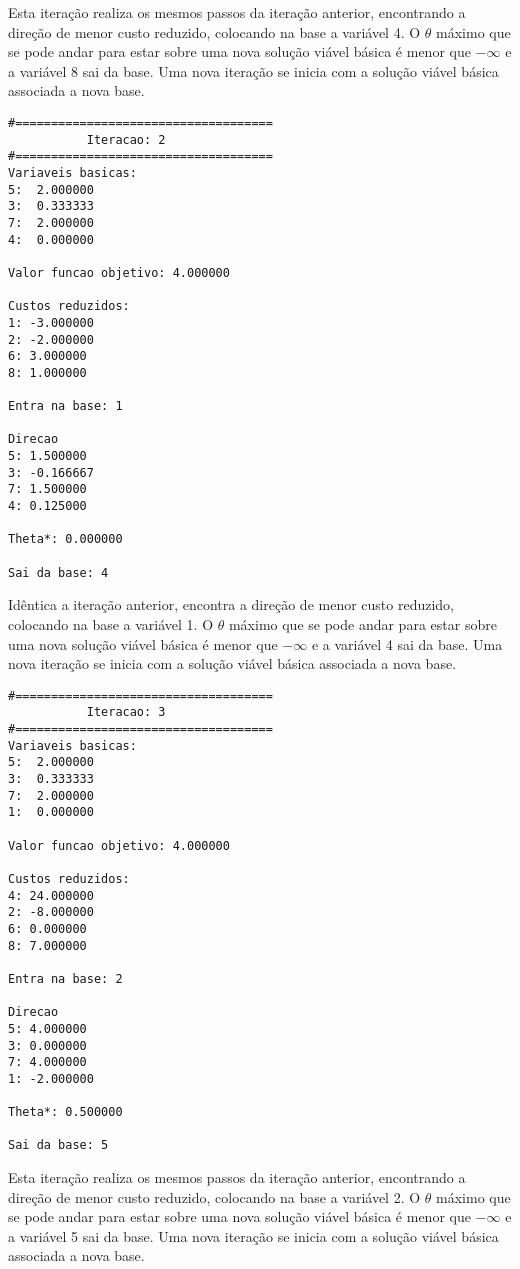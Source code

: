 \documentclass[
	12pt,				%
	openright,			%
	oneside,			%
	a4paper,			%
	english,			%
	french,				%
	spanish,			%
	brazil,				%
	]{abntex2}
\begin{document}
Esta iteração realiza os mesmos passos da iteração anterior, encontrando a direção de menor custo reduzido, colocando na base a variável 4. O $\theta$ máximo que se pode andar para estar sobre uma nova solução viável básica é menor que $-\infty$ e a variável 8 sai da base.
Uma nova iteração se inicia com a solução viável básica associada a nova base.

\begin{verbatim}
#====================================
           Iteracao: 2
#====================================
Variaveis basicas:
5:  2.000000
3:  0.333333
7:  2.000000
4:  0.000000

Valor funcao objetivo: 4.000000

Custos reduzidos:
1: -3.000000
2: -2.000000
6: 3.000000
8: 1.000000

Entra na base: 1

Direcao
5: 1.500000
3: -0.166667
7: 1.500000
4: 0.125000

Theta*: 0.000000

Sai da base: 4
\end{verbatim}

Idêntica a iteração anterior, encontra a direção de menor custo reduzido, colocando na base a variável 1. O $\theta$ máximo que se pode andar para estar sobre uma nova solução viável básica é menor que $-\infty$ e a variável 4 sai da base.
Uma nova iteração se inicia com a solução viável básica associada a nova base.

\begin{verbatim}
#====================================
           Iteracao: 3
#====================================
Variaveis basicas:
5:  2.000000
3:  0.333333
7:  2.000000
1:  0.000000

Valor funcao objetivo: 4.000000

Custos reduzidos:
4: 24.000000
2: -8.000000
6: 0.000000
8: 7.000000

Entra na base: 2

Direcao
5: 4.000000
3: 0.000000
7: 4.000000
1: -2.000000

Theta*: 0.500000

Sai da base: 5
\end{verbatim}

Esta iteração realiza os mesmos passos da iteração anterior, encontrando a direção de menor custo reduzido, colocando na base a variável 2. O $\theta$ máximo que se pode andar para estar sobre uma nova solução viável básica é menor que $-\infty$ e a variável 5 sai da base.
Uma nova iteração se inicia com a solução viável básica associada a nova base.
\end{document}
